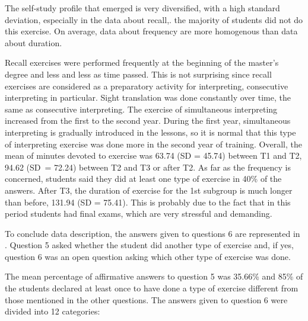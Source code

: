 \documentclass[output=paper]{../langscibook}
\begin{document}
The self-study profile that emerged is very diversified, with a high standard deviation, especially in the data about  recall,. the majority of students did not do this exercise. On average, data about frequency are more homogenous than data about duration.

Recall exercises were performed frequently at the beginning of the master’s degree and less and less as time passed. This is not surprising since recall exercises are considered as a preparatory activity for interpreting, consecutive interpreting in particular. Sight translation was done constantly over time, the same as consecutive interpreting. The exercise of simultaneous interpreting increased from the first to the second year. During the first year, simultaneous interpreting is gradually introduced in the lessons, so it is normal that this type of interpreting exercise was done more in the second year of training. Overall, the mean of minutes devoted to exercise was 63.74 (SD = 45.74) between T1 and T2, 94.62 (SD~= 72.24) between T2 and T3 or after T2. As far as the frequency is concerned, students said they did at least one type of exercise in 40\% of the answers. After T3, the duration of exercise for the 1st subgroup is much longer than before, 131.94 (SD = 75.41). This is probably due to the fact that in this period students had final exams, which are very stressful and demanding.

To conclude data description, the answers given to questions 6 are represented in . Question 5 asked whether the student did another type of exercise and, if yes, question 6 was an open question asking which other type of exercise was done.

The mean percentage of affirmative answers to question 5 was 35.66\% and 85\% of the students declared at least once to have done a type of exercise different from those mentioned in the other questions. The answers given to question 6 were divided into 12 categories:
\end{document}
